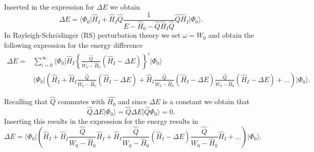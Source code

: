   Inserted in the expression for $\Delta E$ we obtain
  \[
  \Delta E= \langle \Phi_0\vert
  \hat{H}_I+\hat{H}_I\hat{Q}\frac{1}{E-\hat{H}_0-\hat{Q}\hat{H}_I\hat{Q}}\hat{Q}\hat{H}_I\vert
  \Phi_0\rangle.
  \]
  In Rayleigh-Schr\"odinger (RS) perturbation theory \cite{shavittbartlett2009} we set $\omega = W_0$ and obtain the
  following expression for the energy difference
  \begin{align}
  \Delta E =& \sum_{i=0}^{\infty}\langle \Phi_0\vert
  \hat{H}_I\left\{\frac{\hat{Q}}{W_0-\hat{H}_0}\left(\hat{H}_I-\Delta
  E\right)\right\}^i\vert \Phi_0\rangle\\ & \langle \Phi_0\vert
  \left(\hat{H}_I+\hat{H}_I\frac{\hat{Q}}{W_0-\hat{H}_0}(\hat{H}_I-\Delta
  E)+ \hat{H}_I\frac{\hat{Q}}{W_0-\hat{H}_0}(\hat{H}_I-\Delta
  E)\frac{\hat{Q}}{W_0-\hat{H}_0}(\hat{H}_I-\Delta
  E)+\dots\right)\vert \Phi_0\rangle.
  \end{align}



  Recalling that $\hat{Q}$ commutes with $\hat{H_0}$ and since $\Delta
  E$ is a constant we obtain that
  \[
  \hat{Q}\Delta E\vert \Phi_0\rangle = \hat{Q}\Delta E\vert
  \hat{Q}\Phi_0\rangle = 0.
  \]
  Inserting this results in the expression for the energy results in
  \[
  \Delta E=\langle \Phi_0\vert
  \left(\hat{H}_I+\hat{H}_I\frac{\hat{Q}}{W_0-\hat{H}_0}\hat{H}_I+
  \hat{H}_I\frac{\hat{Q}}{W_0-\hat{H}_0}(\hat{H}_I-\Delta
  E)\frac{\hat{Q}}{W_0-\hat{H}_0}\hat{H}_I+\dots\right)\vert
  \Phi_0\rangle.
  \]



